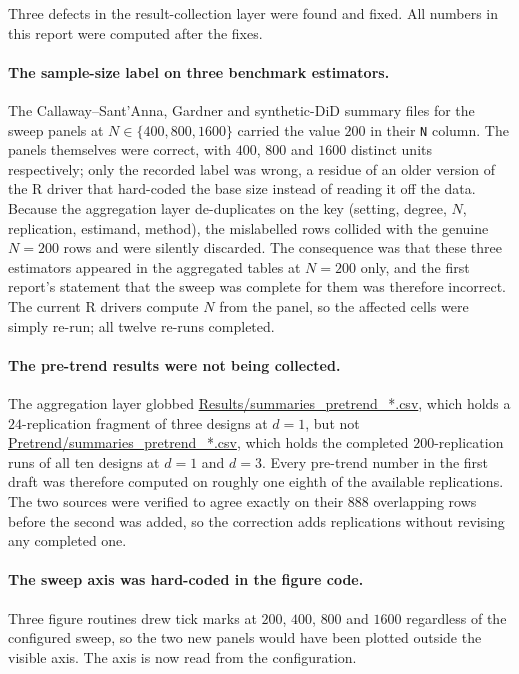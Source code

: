 \documentclass[11pt]{article}
\begin{document}
Three defects in the result-collection layer were found and fixed. All numbers
in this report were computed after the fixes.

\paragraph{The sample-size label on three benchmark estimators.} The
Callaway--Sant'Anna, Gardner and synthetic-DiD summary files for the sweep
panels at $N\in\{400,800,1600\}$ carried the value $200$ in their \texttt{N}
column. The panels themselves were correct, with $400$, $800$ and $1600$
distinct units respectively; only the recorded label was wrong, a residue of
an older version of the R driver that hard-coded the base size instead of
reading it off the data. Because the aggregation layer de-duplicates on the
key (setting, degree, $N$, replication, estimand, method), the mislabelled
rows collided with the genuine $N=200$ rows and were silently discarded. The
consequence was that these three estimators appeared in the aggregated tables
at $N=200$ only, and the first report's statement that the sweep was complete
for them was therefore incorrect. The current R drivers compute $N$ from the
panel, so the affected cells were simply re-run; all twelve re-runs completed.

\paragraph{The pre-trend results were not being collected.} The aggregation
layer globbed \url{Results/summaries_pretrend_*.csv}, which holds a
$24$-replication fragment of three designs at $d=1$, but not
\url{Pretrend/summaries_pretrend_*.csv}, which holds the completed
$200$-replication runs of all ten designs at $d=1$ and $d=3$. Every pre-trend
number in the first draft was therefore computed on roughly one eighth of the
available replications. The two sources were verified to agree exactly on
their $888$ overlapping rows before the second was added, so the correction
adds replications without revising any completed one.

\paragraph{The sweep axis was hard-coded in the figure code.} Three figure
routines drew tick marks at $200$, $400$, $800$ and $1600$ regardless of the
configured sweep, so the two new panels would have been plotted outside the
visible axis. The axis is now read from the configuration.
\end{document}
